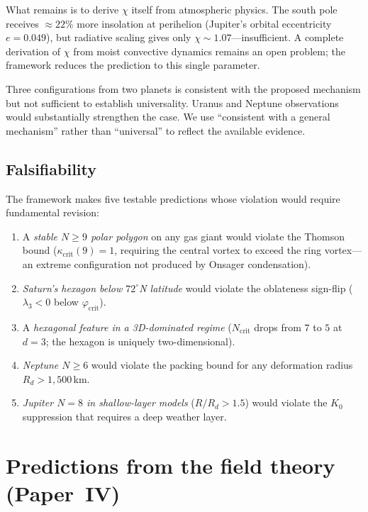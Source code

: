 What remains is to derive $\chi$ itself from atmospheric physics.
The south pole receives $\approx 22\%$ more insolation at perihelion
(Jupiter's orbital eccentricity $e = 0.049$), but radiative scaling
gives only $\chi \sim 1.07$---insufficient.  A complete derivation
of $\chi$ from moist convective dynamics remains an open problem;
the framework reduces the prediction to this single parameter.

Three configurations from two planets is consistent with the proposed
mechanism but not sufficient to establish universality.  Uranus and
Neptune observations would substantially strengthen the case.  We use
``consistent with a general mechanism'' rather than ``universal'' to
reflect the available evidence.

\subsection{Falsifiability}

The framework makes five testable predictions whose violation would
require fundamental revision:
\begin{enumerate}
\item A \emph{stable $N \ge 9$ polar polygon} on any gas giant
  would violate the Thomson bound
  ($\kappa_{\mathrm{crit}}(9) = 1$, requiring the central vortex
  to exceed the ring vortex---an extreme configuration not produced
  by Onsager condensation).
\item \emph{Saturn's hexagon below $72^\circ$N latitude}
  would violate the oblateness sign-flip
  ($\lambda_3 < 0$ below $\varphi_{\mathrm{crit}}$).
\item A \emph{hexagonal feature in a 3D-dominated regime}
  ($N_{\mathrm{crit}}$ drops from $7$ to $5$ at $d = 3$;
  the hexagon is uniquely two-dimensional).
\item \emph{Neptune $N \ge 6$} would violate the packing bound
  for any deformation radius $R_d > 1{,}500$\,km.
\item \emph{Jupiter $N = 8$ in shallow-layer models}
  ($R/R_d > 1.5$) would violate the $K_0$ suppression that
  requires a deep weather layer.
\end{enumerate}

\section{Predictions from the field theory (Paper~IV)}
\label{sec:field-theory-predictions}

